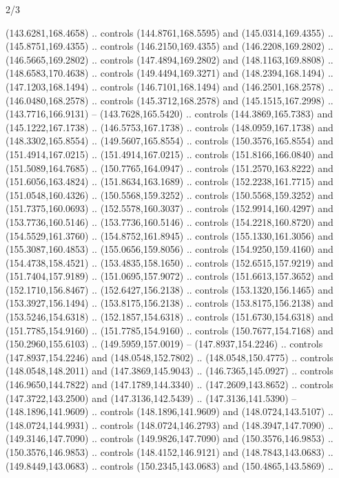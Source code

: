 \begin{flagdescription}{2/3}
\begin{scope}[xshift=0.5\flaglength,yshift=0.5\flagwidth,scale=\flagwidth/180]
\begin{scope}[y=0.8pt, x=0.8pt, yscale=-1,shift={(-168.75,-108.75)}]
  (143.6281,168.4658) .. controls (144.8761,168.5595) and (145.0314,169.4355) ..
  (145.8751,169.4355) .. controls (146.2150,169.4355) and (146.2208,169.2802) ..
  (146.5665,169.2802) .. controls (147.4894,169.2802) and (148.1163,169.8808) ..
  (148.6583,170.4638) .. controls (149.4494,169.3271) and (148.2394,168.1494) ..
  (147.1203,168.1494) .. controls (146.7101,168.1494) and (146.2501,168.2578) ..
  (146.0480,168.2578) .. controls (145.3712,168.2578) and (145.1515,167.2998) ..
  (143.7716,166.9131) -- (143.7628,165.5420) .. controls (144.3869,165.7383) and
  (145.1222,167.1738) .. (146.5753,167.1738) .. controls (148.0959,167.1738) and
  (148.3302,165.8554) .. (149.5607,165.8554) .. controls (150.3576,165.8554) and
  (151.4914,167.0215) .. (151.4914,167.0215) .. controls (151.8166,166.0840) and
  (151.5089,164.7685) .. (150.7765,164.0947) .. controls (151.2570,163.8222) and
  (151.6056,163.4824) .. (151.8634,163.1689) .. controls (152.2238,161.7715) and
  (151.0548,160.4326) .. (150.5568,159.3252) .. controls (150.5568,159.3252) and
  (151.7375,160.0693) .. (152.5578,160.3037) .. controls (152.9914,160.4297) and
  (153.7736,160.5146) .. (153.7736,160.5146) .. controls (154.2218,160.8720) and
  (154.5529,161.3760) .. (154.8752,161.8945) .. controls (155.1330,161.3056) and
  (155.3087,160.4853) .. (155.0656,159.8056) .. controls (154.9250,159.4160) and
  (154.4738,158.4521) .. (153.4835,158.1650) .. controls (152.6515,157.9219) and
  (151.7404,157.9189) .. (151.0695,157.9072) .. controls (151.6613,157.3652) and
  (152.1710,156.8467) .. (152.6427,156.2138) .. controls (153.1320,156.1465) and
  (153.3927,156.1494) .. (153.8175,156.2138) .. controls (153.8175,156.2138) and
  (153.5246,154.6318) .. (152.1857,154.6318) .. controls (151.6730,154.6318) and
  (151.7785,154.9160) .. (151.7785,154.9160) .. controls (150.7677,154.7168) and
  (150.2960,155.6103) .. (149.5959,157.0019) -- (147.8937,154.2246) .. controls
  (147.8937,154.2246) and (148.0548,152.7802) .. (148.0548,150.4775) .. controls
  (148.0548,148.2011) and (147.3869,145.9043) .. (146.7365,145.0927) .. controls
  (146.9650,144.7822) and (147.1789,144.3340) .. (147.2609,143.8652) .. controls
  (147.3722,143.2500) and (147.3136,142.5439) .. (147.3136,141.5390) --
  (148.1896,141.9609) .. controls (148.1896,141.9609) and (148.0724,143.5107) ..
  (148.0724,144.9931) .. controls (148.0724,146.2793) and (148.3947,147.7090) ..
  (149.3146,147.7090) .. controls (149.9826,147.7090) and (150.3576,146.9853) ..
  (150.3576,146.9853) .. controls (148.4152,146.9121) and (148.7843,143.0683) ..
  (149.8449,143.0683) .. controls (150.2345,143.0683) and (150.4865,143.5869) ..

\end{scope}
\end{scope}
\end{flagdescription}
